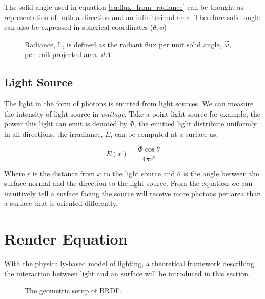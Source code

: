 The solid angle used in equation \ref{eq:flux_from_radiance} can be thought as representation of both a direction and an infinitesimal area. Therefore solid angle can also be expressed in spherical coordinates (\(\theta, \phi\))

\begin{figure}[htp] 
    \centering 
    \renewcommand{\thefigure}{\thechapter.\arabic{figure}}
    \caption[]{Radiance, L, is defined as the radiant flux per unit solid angle, \(\overrightarrow{\omega}\), per unit projected area, \(dA\)}
    \label{fig:radiance_solid_angle} 
\end{figure} 

\subsection{Light Source}
The light in the form of photons is emitted from light sources. We can measure the intensity of light source in \emph{wattage}. Take a point light source for example, the power this light can emit is denoted by \(\Phi\), the emitted light distribute uniformly in all directions, the irradiance, \(E\), can be computed at a surface as: 

\begin{equation}
E(x) = \frac{\Phi \cos{\theta}}{4\pi r^{2}} 
\end{equation}

Where \(r\) is the distance from \(x\) to the light source and \(\theta\) is the angle between the surface normal and the direction to the light source. From the equation we can intuitively tell a surface facing the source will receive more photons per area than a surface that is oriented differently.   



\section{Render Equation}
With the physically-based model of lighting, a theoretical framework describing the interaction between light and an surface will be introduced in this section. 

\begin{figure}[htp] 
    \centering 
    \renewcommand{\thefigure}{\thechapter.\arabic{figure}}
    \caption[]{The geometric setup of BRDF. }
    \label{fig:brdf} 
\end{figure} 

